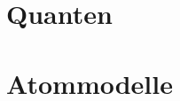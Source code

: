\documentclass[9pt, twopage]{book}
\begin{document}
\chapter{Quanten} \label{ch:Quanten}


\chapter{Atommodelle} \label{ch:Atommodelle}


\newpage
\begingroup
\setlength{\parindent}{0pt}
\setlength{\parskip}{4pt}
\renewcommand{\notesname}{Endnoten}
\def\enotesize{\small}
\theendnotes
\endgroup


%	
\end{document}
